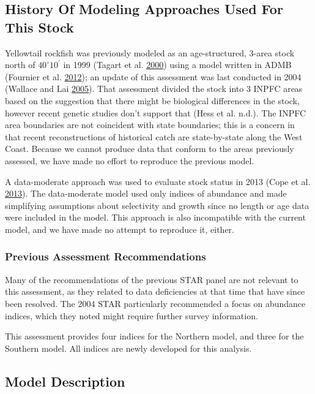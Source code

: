 \documentclass[12pt,]{article}
\begin{document}
\subsection{History Of Modeling Approaches Used For This
Stock}\label{history-of-modeling-approaches-used-for-this-stock}

Yellowtail rockfish was previously modeled as an age-structured, 3-area
stock north of \(40^\circ 10^\prime\) in 1999 (Tagart et al.
\protect\hyperlink{ref-Tagart2000}{2000}) using a model written in ADMB
(Fournier et al. \protect\hyperlink{ref-Fournier2012}{2012}); an update
of this assessment was last conducted in 2004 (Wallace and Lai
\protect\hyperlink{ref-Wallace2005}{2005}). That assessment divided the
stock into 3 INPFC areas based on the suggestion that there might be
biological differences in the stock, however recent genetic studies
don't support that (Hess et al. n.d.). The INPFC area boundaries are not
coincident with state boundaries; this is a concern in that recent
reconstructions of historical catch are state-by-state along the West
Coast. Because we cannot produce data that conform to the areas
previously assessed, we have made no effort to reproduce the previous
model.

A data-moderate approach was used to evaluate stock status in 2013 (Cope
et al. \protect\hyperlink{ref-Cope2013}{2013}). The data-moderate model
used only indices of abundance and made simplifying assumptions about
selectivity and growth since no length or age data were included in the
model. This approach is also incompatible with the current model, and we
have made no attempt to reproduce it, either.

\subsubsection{Previous Assessment
Recommendations}\label{previous-assessment-recommendations}

Many of the recommendations of the previous STAR panel are not relevant
to this assessment, as they related to data deficiencies at that time
that have since been resolved. The 2004 STAR particularly recommended a
focus on abundance indices, which they noted might require further
survey information.

This assessment provides four indices for the Northern model, and three
for the Southern model. All indices are newly developed for this
analysis.

\clearpage
\newpage

\subsection{Model Description}\label{model-description}
\end{document}
